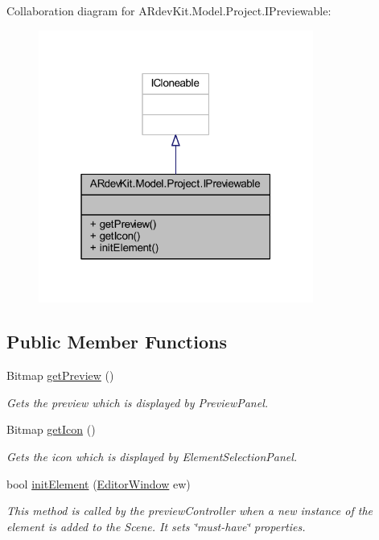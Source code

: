 Collaboration diagram for A\-Rdev\-Kit.\-Model.\-Project.\-I\-Previewable\-:
\nopagebreak
\begin{figure}[H]
\begin{center}
\leavevmode
\includegraphics[width=256pt]{interface_a_rdev_kit_1_1_model_1_1_project_1_1_i_previewable__coll__graph}
\end{center}
\end{figure}
\subsection*{Public Member Functions}
\begin{DoxyCompactItemize}
\item 
Bitmap \hyperlink{interface_a_rdev_kit_1_1_model_1_1_project_1_1_i_previewable_a7cbcbb20929f4f1b6db3321ed2e83070}{get\-Preview} ()
\begin{DoxyCompactList}\small\item\em Gets the preview which is displayed by Preview\-Panel. \end{DoxyCompactList}\item 
Bitmap \hyperlink{interface_a_rdev_kit_1_1_model_1_1_project_1_1_i_previewable_a8573bdaccd5227400b538c34c1b5f279}{get\-Icon} ()
\begin{DoxyCompactList}\small\item\em Gets the icon which is displayed by Element\-Selection\-Panel. \end{DoxyCompactList}\item 
bool \hyperlink{interface_a_rdev_kit_1_1_model_1_1_project_1_1_i_previewable_aa638e27d88c30b7e63b241d1001042c9}{init\-Element} (\hyperlink{class_a_rdev_kit_1_1_editor_window}{Editor\-Window} ew)
\begin{DoxyCompactList}\small\item\em This method is called by the preview\-Controller when a new instance of the element is added to the Scene. It sets \char`\"{}must-\/have\char`\"{} properties. \end{DoxyCompactList}\end{DoxyCompactItemize}


